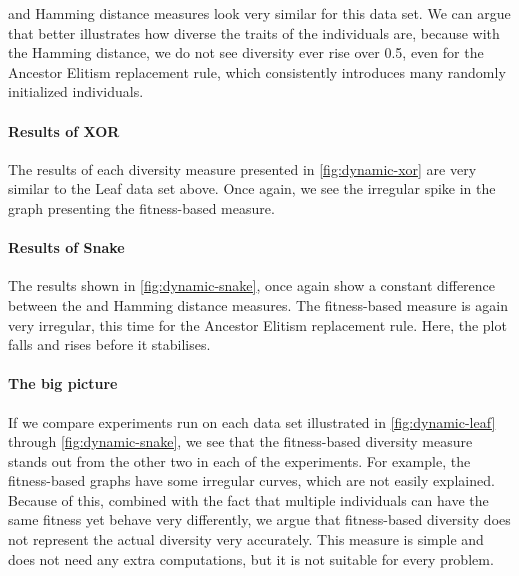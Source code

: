 \dia{} and Hamming distance measures look very similar for this data set. We can argue that \dia{} better illustrates how diverse the traits of the individuals are, because with the Hamming distance, we do not see diversity ever rise over \num{0.5}, even for the Ancestor Elitism replacement rule, which consistently introduces many randomly initialized individuals. 



\paragraph{Results of XOR} The results of each diversity measure presented in \cref{fig:dynamic-xor} are very similar to the Leaf data set above. Once again, we see the irregular spike in the graph presenting the fitness-based measure. %



\paragraph{Results of Snake} The results shown in \cref{fig:dynamic-snake}, once again show a constant difference between the \dia{} and Hamming distance measures. The fitness-based measure is again very irregular, this time for the Ancestor Elitism replacement rule. Here, the plot falls and rises before it stabilises.



\paragraph{The big picture} If we compare experiments run on each data set illustrated in \cref{fig:dynamic-leaf} through \cref{fig:dynamic-snake}, we see that the fitness-based diversity measure stands out from the other two in each of the experiments. For example, the fitness-based graphs have some irregular curves, which are not easily explained. Because of this, combined with the fact that multiple individuals can have the same fitness yet behave very differently, we argue that fitness-based diversity does not represent the actual diversity very accurately. This measure is simple and does not need any extra computations, but it is not suitable for every problem. 

